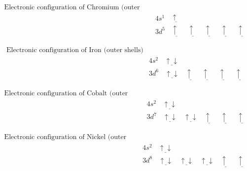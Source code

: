 \begin{equation}
\begin{split}
\text{Electronic configuration of Chromium (outer shells)}\\
&4s^1 \:\:\:\:  \underline{\uparrow \:\:} \\
&3d^5 \:\:\:\:  \underline{\uparrow \:\:} \:\:\:\:  \underline{\uparrow \:\:} \:\:\:\:  \underline{\uparrow \:\:} \:\:\:\: \underline{\uparrow \:\:} \:\:\:\: \underline{\uparrow \:\:}
\end{split}
\label{eq:chromiumconfig}
\end{equation}

\begin{equation}
\begin{split}
\text{Electronic configuration of Iron (outer shells)}\\
&4s^2 \:\:\:\:  \underline{\uparrow \downarrow} \\
&3d^6 \:\:\:\:  \underline{\uparrow \downarrow} \:\:\:\:  \underline{\uparrow \:\:} \:\:\:\:  \underline{\uparrow \:\:} \:\:\:\: \underline{\uparrow \:\:} \:\:\:\: \underline{\uparrow \:\:}
\end{split}
\label{eq:ironconfig}
\end{equation}

\begin{equation}
\begin{split}
\text{Electronic configuration of Cobalt (outer shells)}\\
&4s^2 \:\:\:\:  \underline{\uparrow \downarrow} \\
&3d^7 \:\:\:\:  \underline{\uparrow \downarrow} \:\:\:\:  \underline{\uparrow  \downarrow} \:\:\:\:  \underline{\uparrow \:\:} \:\:\:\: \underline{\uparrow \:\:} \:\:\:\: \underline{\uparrow \:\:}
\end{split}
\label{eq:cobaltconfig}
\end{equation}

\begin{equation}
\begin{split}
\text{Electronic configuration of Nickel (outer shells)}\\
&4s^2 \:\:\:\:  \underline{\uparrow \downarrow} \\
&3d^8 \:\:\:\:  \underline{\uparrow \downarrow} \:\:\:\:  \underline{\uparrow  \downarrow} \:\:\:\:  \underline{\uparrow  \downarrow} \:\:\:\: \underline{\uparrow \:\:} \:\:\:\: \underline{\uparrow \:\:}
\end{split}
\label{eq:nickelconfig}
\end{equation}

